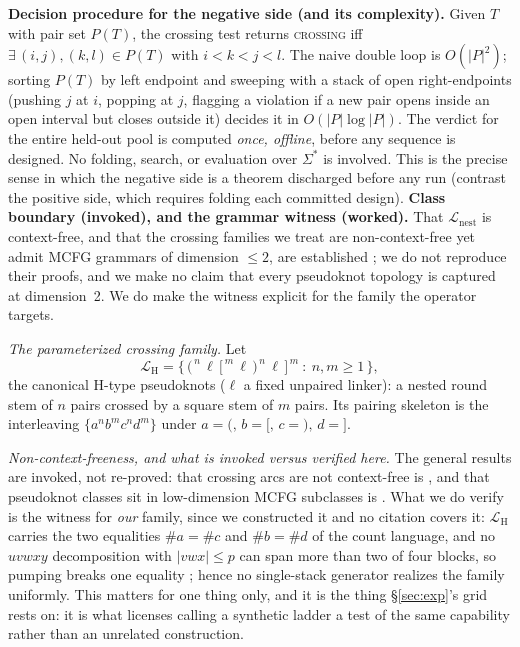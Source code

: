 \documentclass[11pt]{article}
\newcommand{\NESTED}{\ensuremath{\mathcal{L}_{\mathrm{nest}}}}
\begin{document}
\smallskip\noindent\textbf{Decision procedure for the negative side (and its complexity).} Given $T$ with
pair set $P(T)$, the crossing test returns \textsc{crossing} iff $\exists\,(i,j),(k,l)\in P(T)$ with
$i<k<j<l$. The naive double loop is $O(|P|^2)$; sorting $P(T)$ by left endpoint and sweeping with a stack of
open right-endpoints (pushing $j$ at $i$, popping at $j$, flagging a violation if a new pair opens inside an
open interval but closes outside it) decides it in $O(|P|\log|P|)$. The verdict for the entire held-out pool
is computed \emph{once, offline}, before any sequence is designed. No folding, search, or evaluation over
$\Sigma^\ast$ is involved. This is the precise sense in which the negative side is a theorem discharged
before any run (contrast the positive side, which requires folding each committed design).
\noindent\textbf{Class boundary (invoked), and the grammar witness (worked).} That $\NESTED$ is context-free,
and that the crossing families we treat are non-context-free yet admit MCFG grammars of dimension $\le2$, are
established \citep{rivaseddy2000,nebelweinberg,katosekikasami2006}; we do not reproduce their proofs, and we
make no claim that every pseudoknot topology is captured at dimension~2. We do make the witness explicit for
the family the operator targets.

\smallskip\noindent\emph{The parameterized crossing family.} Let
\begin{equation}\label{eq:family}
  \mathcal L_{\mathrm H}=\bigl\{\,\texttt{(}^{\,n}\,\ell\,\texttt{[}^{\,m}\,\ell\,\texttt{)}^{\,n}\,\ell\,\texttt{]}^{\,m}\ :\ n,m\ge 1\,\bigr\},
\end{equation}
the canonical H-type pseudoknots ($\ell$ a fixed unpaired linker): a nested round stem of $n$ pairs crossed by
a square stem of $m$ pairs. Its pairing skeleton is the interleaving $\{a^{n}b^{m}c^{n}d^{m}\}$ under
$a{=}\texttt{(},\,b{=}\texttt{[},\,c{=}\texttt{)},\,d{=}\texttt{]}$.

\smallskip\noindent\emph{Non-context-freeness, and what is invoked versus verified here.} The general results
are invoked, not re-proved: that crossing arcs are not context-free is \citet{nebelweinberg}, and that
pseudoknot classes sit in low-dimension MCFG subclasses is \citet{katosekikasami2006}. What we do verify is the
witness for \emph{our} family, since we constructed it and no citation covers it: $\mathcal L_{\mathrm H}$
carries the two equalities $\#a{=}\#c$ and $\#b{=}\#d$ of the count language, and no
$uvwxy$ decomposition with $|vwx|\le p$ can span more than two of four blocks, so pumping breaks one equality
\citep{ogden1968,hopcroftullman1979}; hence no single-stack generator realizes the family uniformly. This
matters for one thing only, and it is the thing \S\ref{sec:exp}'s grid rests on: it is what licenses calling a
synthetic ladder a test of the same capability rather than an unrelated construction.
\end{document}
